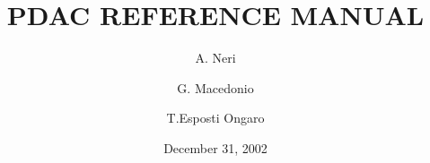 \title
{
PDAC REFERENCE MANUAL
}
\author {A. Neri \and G. Macedonio \and T.Esposti Ongaro}
\date{December 31, 2002}
\maketitle
